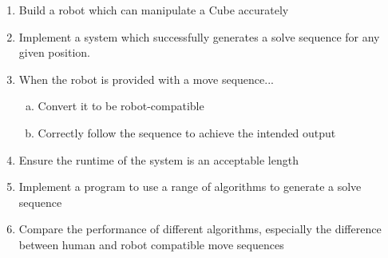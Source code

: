\documentclass{report}
\begin{document}
\begin{appendices}
		\begin{enumerate}
			\item Build a robot which can manipulate a Cube accurately \label{itm:obj1}
			\item Implement a system which successfully generates a solve sequence for any given position. \label{itm:obj2}
			\item When the robot is provided with a move sequence... \label{itm:obj3}
			\begin{enumerate}[a)]
				\item Convert it to be robot-compatible \label{itm:obj3a}
				\item Correctly follow the sequence to achieve the intended output \label{itm:obj3b}
			\end{enumerate}
			\item Ensure the runtime of the system is an acceptable length \label{itm:obj4}
			\item Implement a program to use a range of algorithms to generate a solve sequence \label{itm:obj5}
			\item Compare the performance of different algorithms, especially the difference between human and robot compatible move sequences \label{itm:obj6}
		\end{enumerate}
	
    \end{appendices}
\end{document}

